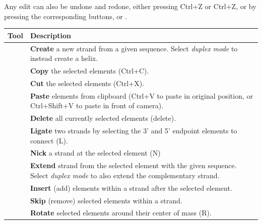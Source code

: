 Any edit can also be undone and redone, either pressing Ctrl+Z or Ctrl+Z, or by pressing the corresponding buttons,  or .


\newcommand{\toolHeight}{1.5em}


\begin{table}[ht]
\centering

\begin{tabularx}{\textwidth} { >{\centering\arraybackslash}m{3em} | X }
 \hline
 Tool & Description \\ [0.5ex] 
 \hline
 \hline
 & \textbf{Create} a new strand from a given sequence. Select \textit{duplex mode} to instead create a helix. \\ \hline
 & \textbf{Copy} the selected elements (Ctrl+C). \\ \hline
 & \textbf{Cut} the selected elements (Ctrl+X). \\ \hline
 & \textbf{Paste} elements from clipboard (Ctrl+V to paste in original position, or Ctrl+Shift+V to paste in front of camera). \\ \hline
 & \textbf{Delete} all currently selected elements (delete). \\ \hline
 & \textbf{Ligate} two strands by selecting the 3' and 5' endpoint elements to connect (L). \\ \hline
 & \textbf{Nick} a strand at the selected element (N) \\ \hline
 & \textbf{Extend} strand from the selected element with the given sequence. Select \textit{duplex mode }to also extend the complementary strand. \\ \hline
 & \textbf{Insert} (add) elements within a strand after the selected element. \\ \hline
 & \textbf{Skip} (remove)  selected elements within a strand. \\ \hline
 & \textbf{Rotate} selected elements around their center of mass (R). \\ \hline

\end{tabularx}
\end{table}
